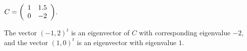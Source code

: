 \documentclass{ximera}
\begin{document}
\begin{exercise} \label{c4.5.5b}
$C=\left(\begin{array}{rr} 1 & 1.5\\ 0 &-2\end{array}\right)$.

\begin{solution}
The vector $(-1,2)^t$ is an eigenvector of $C$ with
corresponding eigenvalue $-2$, and the vector $(1,0)^t$ is an eigenvector
with eigenvalue $1$.


\end{solution}
\end{exercise}
\end{document}
